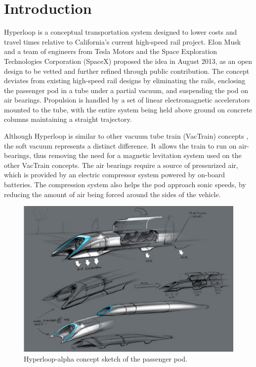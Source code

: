 \documentclass[heading.tex]{subfiles}
\begin{document}
\section{Introduction}

Hyperloop is a conceptual transportation system designed to lower costs and travel times relative to California’s current high-speed rail project.
\cite{Musk} Elon Musk and a team of engineers from Tesla Motors and the Space Exploration Technologies Corporation (SpaceX)
proposed the idea in August 2013, as an open design to be vetted and further refined through public contribution.
The concept deviates from existing high-speed rail designs by eliminating the rails, enclosing the passenger pod in a 
tube under a partial vacuum, and suspending the pod on air bearings. Propulsion is handled by a set of linear 
electromagnetic accelerators mounted to the tube, with the entire system being held above ground on concrete 
columns maintaining a straight trajectory.

Although Hyperloop is similar to other vacuum tube train (VacTrain) concepts \cite{ET3}, the soft vacuum represents a distinct difference.
It allows the train to run on air-bearings, thus removing the need for a magnetic levitation system used on the other VacTrain concepts.
The air bearings require a source of pressurized air, which is provided by an electric compressor system powered by on-board batteries.
The compression system also helps the pod approach sonic speeds, by reducing the amount of air being forced around the sides of the vehicle.

\begin{figure}[hbtp]
\centering
\includegraphics[width=.75\textwidth]{images/hyperloopAlphaSketch.png}
 \caption[Hyperloop Concept Sketch]{Hyperloop-alpha concept sketch of the passenger pod. \cite{Musk}}
\label{f:hyperloopSketch}
\end{figure}
\end{document}
